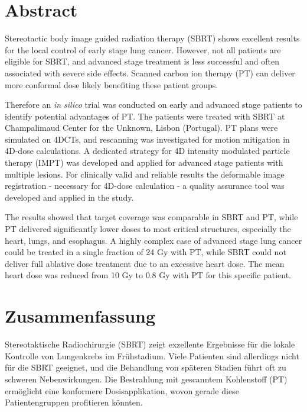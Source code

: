 \section*{Abstract}


Stereotactic body image guided radiation therapy (SBRT) shows excellent results for the local control of early stage lung cancer. 
However, not all patients are eligible for SBRT, and advanced stage treatment is less successful and often associated with severe side effects. 
Scanned carbon ion therapy (PT) can deliver more conformal dose likely benefiting these patient groups.

Therefore an \textit{in silico} trial was conducted on early and advanced stage patients to identify potential advantages of PT. 
The patients were treated with SBRT at Champalimaud Center for the Unknown, Lisbon (Portugal). PT plans were simulated on 4DCTs, 
and rescanning was investigated for motion mitigation in 4D-dose calculations. A dedicated strategy for 4D intensity modulated particle therapy (IMPT)
was developed and applied for advanced stage patients with multiple lesions. For clinically valid and reliable results the deformable 
image registration - necessary for 4D-dose calculation - a quality assurance tool was developed and applied in the study.

The results showed that target coverage was comparable in SBRT and PT, while PT delivered significantly lower doses to 
most critical structures, especially the heart, lungs, and esophagus. A highly complex case of advanced stage lung cancer could be treated
in a single fraction of 24 Gy with PT, while SBRT could not deliver full ablative dose treatment due to an excessive heart dose.
The mean heart dose was reduced from 10 Gy to 0.8 Gy with PT for this specific patient.



\newpage

\section*{Zusammenfassung}

Stereotaktische Radiochirurgie (SBRT) zeigt exzellente Ergebnisse f\"{u}r die lokale Kontrolle von 
Lungenkrebs im Fr\"{u}hstadium. Viele Patienten sind allerdings nicht f\"{u}r die SBRT geeignet, und die 
Behandlung von sp\"{a}teren Stadien f\"{u}hrt oft zu schweren Nebenwirkungen. Die Bestrahlung mit gescanntem 
Kohlenstoff (PT) erm\"{o}glicht eine konformere Dosisapplikation, wovon gerade diese Patientengruppen 
profitieren k\"{o}nnten.

